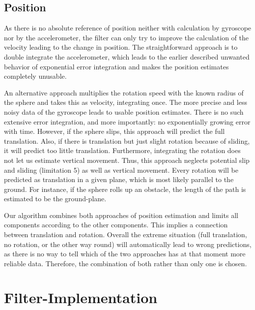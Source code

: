 \documentclass[letterpaper, 10 pt, conference]{ieeeconf}  %
\begin{document}
\subsection{Position}
As there is no absolute reference of position neither with calculation by gyroscope nor by the accelerometer, the filter can only try to improve the calculation of the velocity leading to the change in position. 
The straightforward approach is to double integrate the accelerometer, which leads to the earlier described unwanted behavior of exponential error integration and makes the position estimates completely unusable. 

An alternative approach multiplies the rotation speed with the known radius of the sphere and takes this as velocity, integrating once.
The more precise and less noisy data of the gyroscope leads to usable position estimates. 
There is no such extensive error integration, and more importantly: no exponentially growing error with time. However, if the sphere slips, this approach will predict the full translation.
Also, if there is translation but just slight rotation because of sliding, it will predict too little translation. 
Furthermore, integrating the rotation does not let us estimate vertical movement.
Thus, this approach neglects potential slip and sliding (limitation 5) as well as vertical movement. 
Every rotation will be predicted as translation in a given plane, which is most likely parallel to the ground. 
For instance, if the sphere rolls up an obstacle, the length of the path is estimated to be the ground-plane.

Our algorithm combines both approaches of position estimation and limits all components according to the other components. 
This implies a connection between translation and rotation. 
Overall the extreme situation (full translation, no rotation, or the other way round) will automatically lead to wrong predictions, as there is no way to tell which of the two approaches has at that moment more reliable data.
Therefore, the combination of both rather than only one is chosen.


\section{Filter-Implementation}
\end{document}
